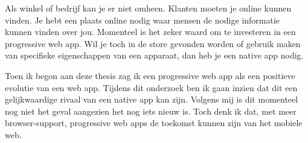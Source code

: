  Als winkel of bedrijf kan je er niet omheen. Klanten moeten je online kunnen vinden. Je hebt een plaats online nodig waar mensen de nodige informatie kunnen vinden over jou. Momenteel is het zeker waard om te investeren in een progressive web app. Wil je toch in de store gevonden worden of gebruik maken van specifieke eigenschappen van een apparaat, dan heb je een native app nodig.
 
 
Toen ik begon aan deze thesis zag ik een progressive web app als een positieve evolutie van een web app. Tijdens dit onderzoek ben ik gaan inzien dat dit een gelijkwaardige rivaal van een native app kan zijn. Volgens mij is dit momenteel nog niet het geval aangezien het nog iets nieuw is. Toch denk ik dat, met meer browser-support, progressive web apps de toekomst kunnen zijn van het mobiele web.








